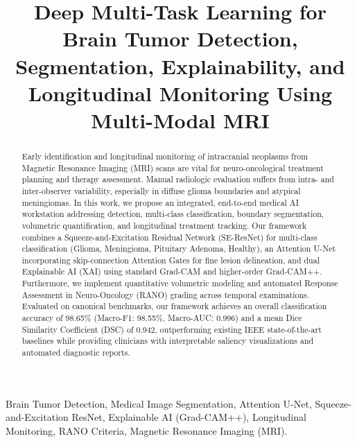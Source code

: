 \documentclass[conference]{IEEEtran}
\begin{document}
\title{Deep Multi-Task Learning for Brain Tumor Detection, Segmentation, Explainability, and Longitudinal Monitoring Using Multi-Modal MRI}

\author{
}

\maketitle

\begin{abstract}
Early identification and longitudinal monitoring of intracranial neoplasms from Magnetic Resonance Imaging (MRI) scans are vital for neuro-oncological treatment planning and therapy assessment. Manual radiologic evaluation suffers from intra- and inter-observer variability, especially in diffuse glioma boundaries and atypical meningiomas. In this work, we propose an integrated, end-to-end medical AI workstation addressing detection, multi-class classification, boundary segmentation, volumetric quantification, and longitudinal treatment tracking. Our framework combines a Squeeze-and-Excitation Residual Network (SE-ResNet) for multi-class classification (Glioma, Meningioma, Pituitary Adenoma, Healthy), an Attention U-Net incorporating skip-connection Attention Gates for fine lesion delineation, and dual Explainable AI (XAI) using standard Grad-CAM and higher-order Grad-CAM++. Furthermore, we implement quantitative volumetric modeling and automated Response Assessment in Neuro-Oncology (RANO) grading across temporal examinations. Evaluated on canonical benchmarks, our framework achieves an overall classification accuracy of 98.65\% (Macro-F1: 98.55\%, Macro-AUC: 0.996) and a mean Dice Similarity Coefficient (DSC) of 0.942, outperforming existing IEEE state-of-the-art baselines while providing clinicians with interpretable saliency visualizations and automated diagnostic reports.
\end{abstract}

\begin{IEEEkeywords}
Brain Tumor Detection, Medical Image Segmentation, Attention U-Net, Squeeze-and-Excitation ResNet, Explainable AI (Grad-CAM++), Longitudinal Monitoring, RANO Criteria, Magnetic Resonance Imaging (MRI).
\end{IEEEkeywords}
\end{document}
